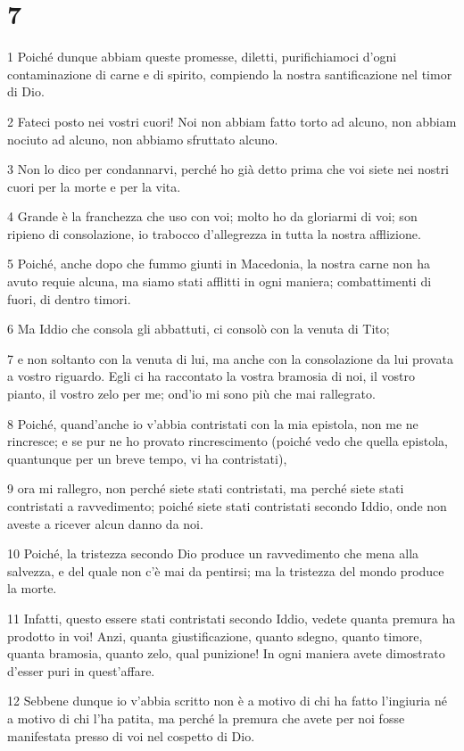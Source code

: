\chapter{7}

\par 1 Poiché dunque abbiam queste promesse, diletti, purifichiamoci d'ogni contaminazione di carne e di spirito, compiendo la nostra santificazione nel timor di Dio.
\par 2 Fateci posto nei vostri cuori! Noi non abbiam fatto torto ad alcuno, non abbiam nociuto ad alcuno, non abbiamo sfruttato alcuno.
\par 3 Non lo dico per condannarvi, perché ho già detto prima che voi siete nei nostri cuori per la morte e per la vita.
\par 4 Grande è la franchezza che uso con voi; molto ho da gloriarmi di voi; son ripieno di consolazione, io trabocco d'allegrezza in tutta la nostra afflizione.
\par 5 Poiché, anche dopo che fummo giunti in Macedonia, la nostra carne non ha avuto requie alcuna, ma siamo stati afflitti in ogni maniera; combattimenti di fuori, di dentro timori.
\par 6 Ma Iddio che consola gli abbattuti, ci consolò con la venuta di Tito;
\par 7 e non soltanto con la venuta di lui, ma anche con la consolazione da lui provata a vostro riguardo. Egli ci ha raccontato la vostra bramosia di noi, il vostro pianto, il vostro zelo per me; ond'io mi sono più che mai rallegrato.
\par 8 Poiché, quand'anche io v'abbia contristati con la mia epistola, non me ne rincresce; e se pur ne ho provato rincrescimento (poiché vedo che quella epistola, quantunque per un breve tempo, vi ha contristati),
\par 9 ora mi rallegro, non perché siete stati contristati, ma perché siete stati contristati a ravvedimento; poiché siete stati contristati secondo Iddio, onde non aveste a ricever alcun danno da noi.
\par 10 Poiché, la tristezza secondo Dio produce un ravvedimento che mena alla salvezza, e del quale non c'è mai da pentirsi; ma la tristezza del mondo produce la morte.
\par 11 Infatti, questo essere stati contristati secondo Iddio, vedete quanta premura ha prodotto in voi! Anzi, quanta giustificazione, quanto sdegno, quanto timore, quanta bramosia, quanto zelo, qual punizione! In ogni maniera avete dimostrato d'esser puri in quest'affare.
\par 12 Sebbene dunque io v'abbia scritto non è a motivo di chi ha fatto l'ingiuria né a motivo di chi l'ha patita, ma perché la premura che avete per noi fosse manifestata presso di voi nel cospetto di Dio.
